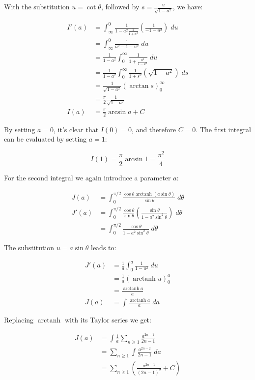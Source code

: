 \documentclass{letter}
\DeclareMathOperator\arctanh{arctanh}
\begin{document}
\begin{letter}{}
  With the substitution $u=\cot\theta$, followed by $s=\frac{u}{\sqrt{1-a^2}}$, we have:

  \begin{align*}
    I'(a) &= 
      \int_{\infty}^0\frac{1}{1-a^2\frac{1}{1+u^2}}\left(\frac{1}{-1-u^2}\right)\;du\\
      &= \int_{\infty}^{0}\frac{1}{a^2-1-u^2}\;du\\
      &= \frac{1}{1-a^2}\int_0^\infty\frac{1}{1+\frac{u^2}{1-a^2}}\;du\\
      &= \frac{1}{1-a^2}\int_0^\infty\frac{1}{1+s^2}\left(\sqrt{1-a^2}\right)\;ds\\
      &= \frac{1}{\sqrt{1-a^2}}\left(\arctan s\right)_0^\infty\\
      &= \frac{\pi}{2}\frac{1}{\sqrt{1-a^2}}\\
    I(a) &= \frac{\pi}{2}\arcsin a + C
  \end{align*}

  By setting $a=0$, it's clear that $I(0)=0$, and therefore $C=0$. The first integral can be evaluated by setting $a=1$:

  $$I(1)=\frac{\pi}{2}\arcsin 1=\frac{\pi^2}{4}$$

  For the second integral we again introduce a parameter $a$:

  \begin{align*}
    J(a) &=
    \int_0^{\pi/2}\frac
      {\cos\theta\arctanh\left(a \sin\theta\right)}
    {\sin\theta}\;d\theta\\
    J'(a) &= 
      \int_0^{\pi/2}\frac
        {\cos\theta}{\sin\theta}\left(\frac{\sin\theta}{1-a^2\sin^2\theta}\right)\;d\theta\\
        &=
      \int_0^{\pi/2}\frac
        {\cos\theta}{1-a^2\sin^2\theta}\;d\theta
  \end{align*}

  The substitution $u=a\sin\theta$ leads to:

  \begin{align*}
    J'(a) &=\frac{1}{a}\int_0^a\frac{1}{1-u^2}\;du\\
    &=\frac{1}{a}\left(\arctanh u\right)_0^a \\
    &=\frac{\arctanh a}{a}\\
    J(a)&=\int\frac{\arctanh a}{a}\;da
  \end{align*}

  Replacing $\arctanh$ with its Taylor series we get:

  \begin{align*}
    J(a) &= \int\frac{1}{a}\sum_{n\ge 1}\frac{a^{2n-1}}{2n-1} \\
    &=\sum_{n\ge 1}\int\frac{a^{2n-2}}{2n-1}\;da \\
    &=\sum_{n\ge 1}\left(\frac{a^{2n-1}}{(2n-1)^2}+C\right) \\
  \end{align*}


\end{letter}
\end{document}
